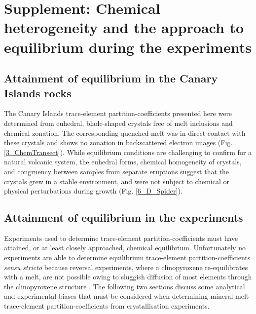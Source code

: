 \section{Supplement: Chemical heterogeneity and the approach to equilibrium during the experiments}
\label{ApproachEq_Sup}
\subsection{Attainment of equilibrium in the Canary Islands rocks}
The Canary Islands trace-element partition-coefficients presented here were determined from euhedral, blade-shaped crystals free of melt inclusions and chemical zonation. The corresponding quenched melt was in direct contact with these crystals and shows no zonation in backscattered electron images (Fig. \ref{3_ChemTransect}). While equilibrium conditions are challenging to confirm for a natural volcanic system, the euhedral forms, chemical homogeneity of crystals, and congruency between samples from separate eruptions suggest that the crystals grew in a stable environment, and were not subject to chemical or physical perturbations during growth (Fig. \ref{6_D_Spider}).	

\subsection{Attainment of equilibrium in the experiments}
Experiments used to determine trace-element partition-coefficients must have attained, or at least closely approached, chemical equilibrium. Unfortunately no experiments are able to determine equilibrium trace-element partition-coefficients \emph{sensu stricto} because reversal experiments, where a clinopyroxene re-equilibrates with a melt, are not possible owing to sluggish diffusion of most elements through the clinopyroxene structure \citep{VanOrman2001,Zhang2010}.
     The following two sections discuss some analytical and experimental biases that must be considered when determining mineral-melt trace-element partition-coefficients from crystallisation experiments.

